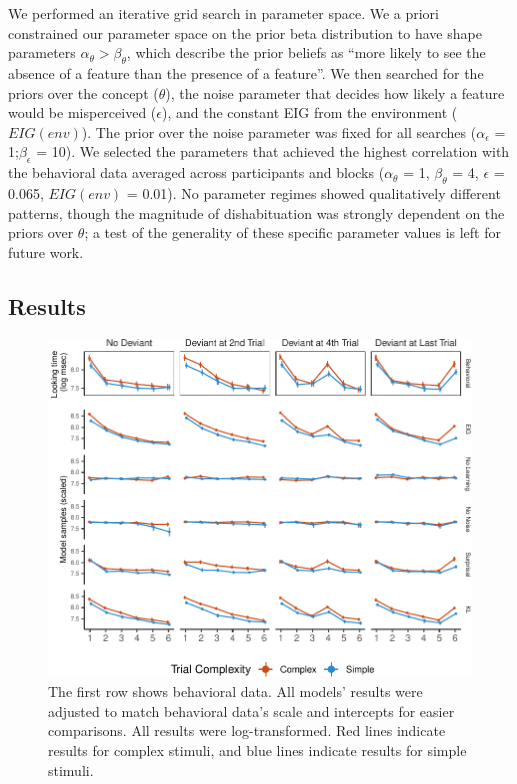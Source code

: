 \documentclass[
  man,floatsintext]{apa6}
\begin{document}
We performed an iterative grid search in parameter space. We a priori constrained our parameter space on the prior beta distribution to have shape parameters \(\alpha_{\theta} > \beta_{\theta}\), which describe the prior beliefs as ``more likely to see the absence of a feature than the presence of a feature''. We then searched for the priors over the concept (\(\theta\)), the noise parameter that decides how likely a feature would be misperceived (\(\epsilon\)), and the constant EIG from the environment (\(EIG(env)\)). The prior over the noise parameter was fixed for all searches (\(\alpha_{\epsilon}\) = 1;\(\beta_{\epsilon}\) = 10). We selected the parameters that achieved the highest correlation with the behavioral data averaged across participants and blocks (\(\alpha_{\theta}\) = 1, \(\beta_{\theta}\) = 4, \(\epsilon\) = 0.065, \(EIG(env)\) = 0.01). No parameter regimes showed qualitatively different patterns, though the magnitude of dishabituation was strongly dependent on the priors over \(\theta\); a test of the generality of these specific parameter values is left for future work.

\hypertarget{results-1}{%
\subsection{Results}\label{results-1}}

\begin{figure}

{\centering \includegraphics[width=\textwidth]{pokebaby_main_files/figure-latex/unnamed-chunk-12-1} 

}

\caption{The first row shows behavioral data. All models’ results were adjusted to match behavioral data’s scale and intercepts for easier comparisons. All results were log-transformed. Red lines indicate results for complex stimuli, and blue lines indicate results for simple stimuli.}\label{fig:unnamed-chunk-12}
\end{figure}
\end{document}
